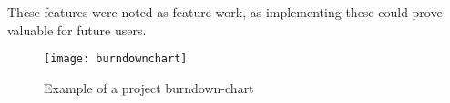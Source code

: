 These features were noted as feature work, as implementing these could prove valuable for future users. 

\begin{figure}[H]
    \centering
        \texttt{[image: burndownchart]}
    \caption{Example of a project burndown-chart}
    \label{burndownchart}
\end{figure}
